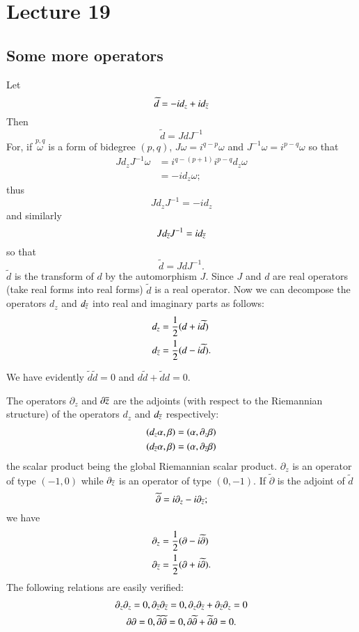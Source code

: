 \chapter{Lecture 19}

\section*{Some more operators}\pageoriginale

Let 
$$
\widetilde{d}=-id_{z}+id_{\overline{z}}
$$
Then
$$
\widetilde{d}=JdJ^{-1}
$$
For, if $\overset{p,q}{\omega}$ is a form of bidegree $(p,q)$,
$J\omega=i^{q-p}\omega$ and $J^{-1}\omega=i^{p-q}\omega$ so that
\begin{align*}
Jd_{z}J^{-1}\omega &= i^{q-(p+1)}i^{p-q}d_{z}\omega\\
&= -i d_{z}\omega;
\end{align*}
thus
$$
Jd_{z}J^{-1}=-id_{z}
$$
and similarly
$$
Jd_{\overline{z}}J^{-1}=id_{\overline{z}}
$$
so that
$$
\widetilde{d}=JdJ^{-1}.
$$
$\widetilde{d}$ is the transform of $d$ by the automorphism $J$. Since
$J$ and $d$ are real operators (\iec take real forms into real forms)
$\widetilde{d}$ is a real operator. Now we can decompose the operators
$d_{z}$ and $d_{\overline{z}}$ into real and imaginary parts as follows:
\begin{align*}
d_{z} &= \frac{1}{2}(d+i\widetilde{d})\\
d_{\overline{z}} &= \frac{1}{2}(d-i\widetilde{d}).
\end{align*}

We have evidently $\widetilde{d}\widetilde{d}=0$ and
$d\widetilde{d}+\widetilde{d}d=0$. 

The operators $\partial_{z}$ and $\partial \overline{z}$ are the adjoints
(with respect to the Riemannian structure) of the operators $d_{z}$
and $d_{\overline{z}}$ respectively: 
\begin{align*}
(d_{z}\alpha,\beta) &= (\alpha,\partial_{z}\beta)\\
(d_{\overline{z}}\alpha,\beta) &= (\alpha,\partial_{\overline{z}}\beta)
\end{align*}\pageoriginale
the scalar product being the global Riemannian scalar
product. $\partial_{z}$ is an operator of type $(-1,0)$ while
$\partial_{\overline{z}}$ is an operator of type $(0,-1)$. If
$\widetilde{\partial}$ is the adjoint of $\widetilde{d}$
$$
\widetilde{\partial}=i\partial_{z}-i\partial_{\overline{z}};
$$
we have
\begin{align*}
\partial_{z} &= \frac{1}{2}(\partial-i\widetilde{\partial})\\
\partial_{\overline{z}} &= \frac{1}{2}(\partial +i\widetilde{\partial}).
\end{align*}
The following relations are easily verified:
\begin{gather*}
\partial_{z}\partial_{z}=0,
\partial_{\overline{z}}\partial_{\overline{z}}=0,\partial_{z}\partial_{\overline{z}}+\partial_{\overline{z}}\partial_{z}=0\\
\partial\partial =0, \widetilde{\partial}\widetilde{\partial}=0,
\partial\widetilde{\partial}+\widetilde{\partial}\partial=0. 
\end{gather*}

